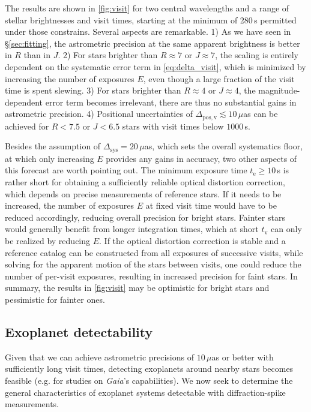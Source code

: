 \documentclass[modern, times]{aastex61}
\newcommand\gaia{\textit{Gaia}}
\begin{document}
The results are shown in \autoref{fig:visit} for two central wavelengths and a range of stellar brightnesses and visit times, starting at the minimum of 280\,s permitted under those constrains.
Several aspects are remarkable.
1) As we have seen in \S\ref{sec:fitting}, the astrometric precision at the same apparent brightness is better in $R$ than in $J$.
2) For stars brighter than $R\approx 7$ or $J\approx7$, the scaling is entirely dependent on the systematic error term in \autoref{eq:delta_visit}, which is minimized by increasing the number of exposures $E$, even though a large fraction of the visit time is spent slewing. 
3) For stars brighter than $R\approx4$ or $J\approx 4$, the magnitude-dependent error term becomes irrelevant, there are thus no substantial gains in astrometric precision.
4) Positional uncertainties of $\Delta_\mathrm{pos,v} \lesssim 10\,\mu$as can be achieved for $R<7.5$ or $J<6.5$ stars with visit times below $1000\,$s.

Besides the assumption of $\Delta_\mathrm{sys}=20\,\mu$as, which sets the overall systematics floor, at which only increasing $E$ provides any gains in accuracy, two other aspects of this forecast are worth pointing out. 
The minimum exposure time $t_\mathrm{e} \geq 10\,$s is rather short for obtaining a sufficiently reliable optical distortion correction, which depends on precise measurements of reference stars. 
If it needs to be increased, the number of exposures $E$ at fixed visit time would have to be reduced accordingly, reducing overall precision for bright stars.
Fainter stars would generally benefit from longer integration times, which at short $t_\mathrm{v}$ can only be realized by reducing $E$.
If the optical distortion correction is stable and a reference catalog can be constructed from all exposures of successive visits, while solving for the apparent motion of the stars between visits, one could reduce the number of per-visit exposures, resulting in increased precision for faint stars.
In summary, the results in \autoref{fig:visit} may be optimistic for bright stars and pessimistic for fainter ones.

\subsection{Exoplanet detectability}

Given that we can achieve astrometric precisions of $10\,\mu$as or better with sufficiently long visit times, detecting exoplanets around nearby stars becomes feasible (e.g. \citealt{Perryman2014,Sozzetti2015} for studies on \gaia's capabilities).
We now seek to determine the general characteristics of exoplanet systems detectable with diffraction-spike measurements.
\end{document}
